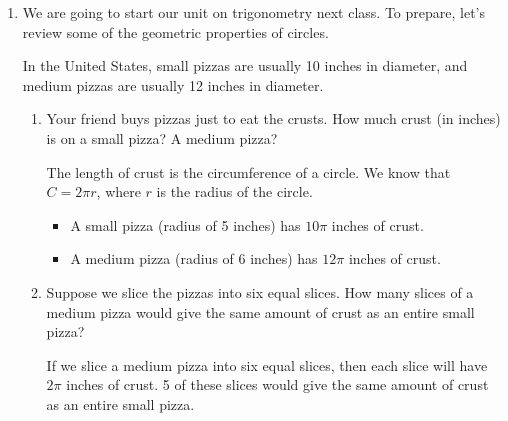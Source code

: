 \documentclass{article}
\begin{document}
\begin{enumerate}[topsep=0pt]
  \begin{solution}
    (A) would not work; we can't simplify the natural log of a sum.  (B) and (C)
    both work, but (B) is a bit more efficient.
  \end{solution}

\pspace{\newpage}

\item 
\begin{problem}
    We are going to start our unit on trigonometry next class. To prepare, let's review some of the geometric properties of circles.

    In the United States, small pizzas are usually 10 inches in diameter, and medium pizzas are usually 12 inches in diameter.
\end{problem}

\begin{enumerate}
    \item 
    \begin{problem}
    Your friend buys pizzas just to eat the crusts. How much crust (in inches) is on a small pizza? A medium pizza?
    \end{problem}
    \pspace{\vfill}

    \begin{solution}
        The length of crust is the circumference of a circle. We know that $C=2\pi r$, where $r$ is the radius of the circle.
        \begin{itemize}
            \item A small pizza (radius of 5 inches) has $10\pi$ inches of crust.
            \item A medium pizza (radius of 6 inches) has $12\pi$ inches of crust.
        \end{itemize}
    \end{solution}

    \item 
    \begin{problem}
    Suppose we slice the pizzas into six equal slices. How many slices of a medium pizza would give the same amount of crust as an entire small pizza?
    \end{problem}
    \pspace{\vfill}

    \begin{solution}
        If we slice a medium pizza into six equal slices, then each slice will have $2\pi$ inches of crust. 5 of these slices would give the same amount of crust as an entire small pizza.
    \end{solution}


\end{enumerate}
\end{enumerate}
\end{document}

